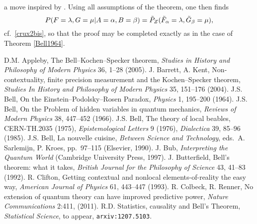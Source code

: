 \documentclass[11pt]{article}
\newcommand{\er}{\eqref}
\newcommand{\al}{\alpha} \newcommand{\bt}{L\beta}
\newcommand{\lm}{\lambda} \newcommand{\Lm}{\Lambda}
\begin{document}
a move inspired by \cite{WW}. Using all assumptions of the theorem, one then finds
\begin{equation}
P(F=\lm,G=\mu|A=\al,B=\beta)=\til{P}_Z(\til{F}_{\al}=\lm,\til{G}_{\beta}=\mu), \label{crux3bis}
\end{equation}
cf.\ \er{crux2bis}, so that the proof may be completed exactly as in the case of Theorem \ref{Bell1964}. \enp
\begin{thebibliography}{99}
 D.M. Appleby, The Bell--Kochen--Specker theorem, \emph{Studies in History and Philosophy of Modern Physics} 36, 1--28 (2005).
 J. Barrett, A. Kent,  Non-contextuality, finite precision measurement and the Kochen--Specker theorem, \emph{Studies In History and Philosophy of Modern Physics} 35, 151--176 (2004).
 J.S. Bell, On the Einstein--Podolsky--Rosen Paradox, \emph{Physics} 1, 195--200 (1964).
 J.S. Bell, On the Problem of hidden variables in quantum mechanics, \emph{Reviews of Modern Physics} 38, 447--452 (1966). 
 J.S. Bell, The theory of local beables, CERN-TH.2035 (1975), \emph{Epistemological Letters} 9 (1976), \emph{Dialectica} 39, 85--96 (1985). 
 J.S. Bell, La nouvelle cuisine, \emph{Between Science and Technology}, eds.\ A. Sarlemijn, P. Kroes, pp.\ 97--115 (Elsevier, 1990). 
 J. Bub, \emph{Interpreting the Quantum World} (Cambridge University Press, 1997).
  J. Butterfield, Bell's theorem: what it takes, \emph{British Journal for the  Philosophy of Science} 43, 41--83  (1992).
R. Clifton, Getting contextual and nonlocal elements-of-reality the easy way, \emph{American Journal of Physics}
 61, 443--447 (1993).
   R. Colbeck, R. Renner, No extension of quantum theory can have improved predictive power, \emph{Nature Communications} 2:411, (2011). 
  R.D. Statistics, causality and Bell's Theorem, \emph{Statistical Science}, to appear, \texttt{arxiv:1207.5103}.

\end{thebibliography}
\end{document}
